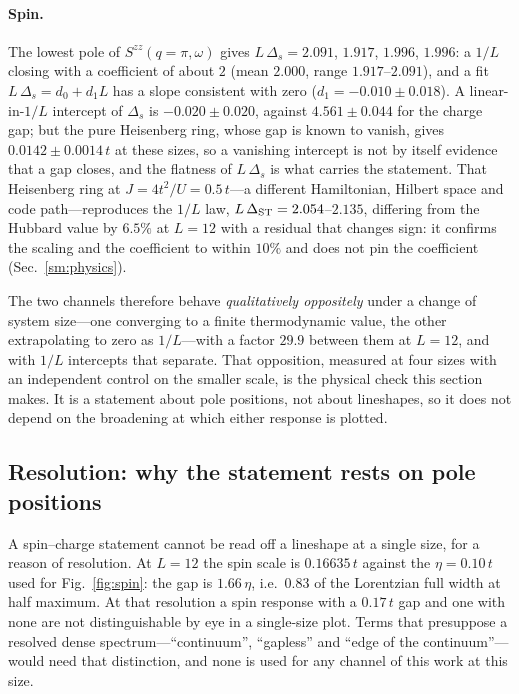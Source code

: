 \paragraph{Spin.} The lowest pole of $S^{zz}(q=\pi,\omega)$ gives $L\,\Delta_{s}=2.091$, $1.917$,
$1.996$, $1.996$: a $1/L$ closing with a coefficient of about $2$ (mean $2.000$, range
$1.917$--$2.091$), and a fit $L\,\Delta_{s}=d_0+d_1L$ has a slope consistent with zero
($d_1=-0.010\pm0.018$). A linear-in-$1/L$ intercept of $\Delta_s$ is $-0.020\pm0.020$, against
$4.561\pm0.044$ for the charge gap; but the pure Heisenberg ring, whose gap is known to vanish, gives
$0.0142\pm0.0014\,t$ at these sizes, so a vanishing intercept is not by itself evidence that a gap
closes, and the flatness of $L\,\Delta_s$ is what carries the statement. That Heisenberg ring at
$J=4t^{2}/U=0.5\,t$---a different Hamiltonian, Hilbert space and code path---reproduces the $1/L$ law,
$L\,\Delta_{\rm ST}=2.054$--$2.135$, differing from the Hubbard value by $6.5\%$ at $L=12$ with a
residual that changes sign: it confirms the scaling and the coefficient to within $10\%$ and does not
pin the coefficient (Sec.~\ref{sm:physics}).

The two channels therefore behave \emph{qualitatively oppositely} under a change of system size---one
converging to a finite thermodynamic value, the other extrapolating to zero as $1/L$---with a factor
$29.9$ between them at $L=12$, and with $1/L$ intercepts that separate. That
opposition, measured at four sizes with an independent control on the smaller scale, is the physical
check this section makes. It is a statement about pole positions, not about lineshapes, so it does
not depend on the broadening at which either response is plotted.

\subsection{Resolution: why the statement rests on pole positions}

A spin--charge statement cannot be read off a lineshape at a single size, for a reason of resolution. At $L=12$ the spin scale is $0.16635\,t$ against the $\eta=0.10\,t$ used for
Fig.~\ref{fig:spin}: the gap is $1.66\,\eta$, i.e.\ $0.83$ of the Lorentzian full width at half
maximum. At that resolution a spin response with a $0.17\,t$ gap and one with none are not
distinguishable by eye in a single-size plot. Terms that presuppose a resolved dense
spectrum---``continuum'', ``gapless'' and ``edge of the continuum''---would need that distinction,
and none is used for any channel of this work at this size.

